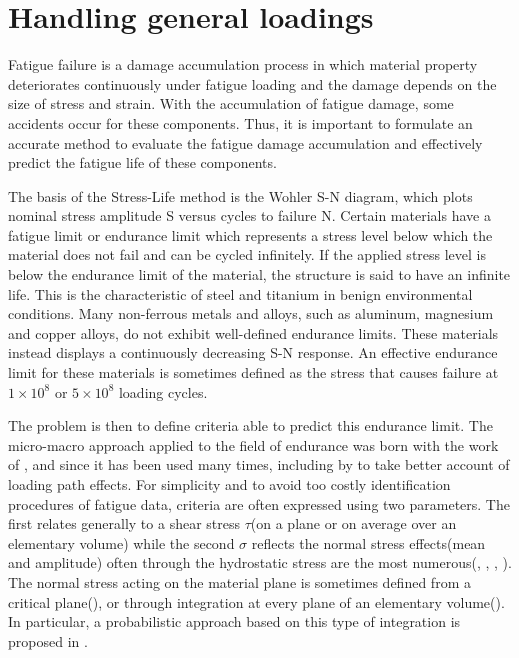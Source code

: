 \chapter{Handling general loadings}\label{chp:5}
\minitoc

Fatigue failure is a damage accumulation process in which material property deteriorates continuously under fatigue loading and the damage depends on the size of stress and strain. With the accumulation of fatigue damage, some accidents occur for these components. Thus, it is important to formulate an accurate method to evaluate the fatigue damage accumulation and effectively predict the fatigue life of these components.

The basis of the Stress-Life method is the Wohler S-N diagram, which plots nominal stress amplitude S versus cycles to failure N. Certain materials have a fatigue limit or endurance limit which represents a stress level below which the material does not fail and can be cycled infinitely. If the applied stress level is below the endurance limit of the material, the structure is said to have an infinite life. This is the characteristic of steel and titanium in benign environmental conditions. Many non-ferrous metals and alloys, such as aluminum, magnesium and copper alloys, do not exhibit well-defined endurance limits. These materials instead displays a continuously decreasing S-N response. An effective endurance limit for these materials is sometimes defined as the stress that causes failure at $1\times10^8$ or $5\times10^8$ loading cycles.

The problem is then to define criteria able to predict this endurance limit. The micro-macro approach applied to the field of endurance was born with the work of \cite{van1973khmu}, and since it has been used many times, including by \cite{papadopoulos2001long} to take better account of loading path effects. For simplicity and to avoid too costly identification procedures of fatigue data, criteria are often expressed using two parameters. The first relates generally to a shear stress $\tau$(on a plane or on average over an elementary volume) while the second $\sigma$ reflects the normal stress effects(mean and amplitude) often through the hydrostatic stress are the most numerous(\cite{crossland1956effect}, \cite{sines1959behavior}, \cite{FFE:FFE452}, \cite{thu2008effet}).  The normal stress acting on the material plane is sometimes defined from a critical plane(\cite{findley1959}), or through integration at every plane of an elementary volume(\cite{liu1993berechnung}).  In particular, a probabilistic approach based on this type of integration is proposed in \cite{thu2008effet} .

